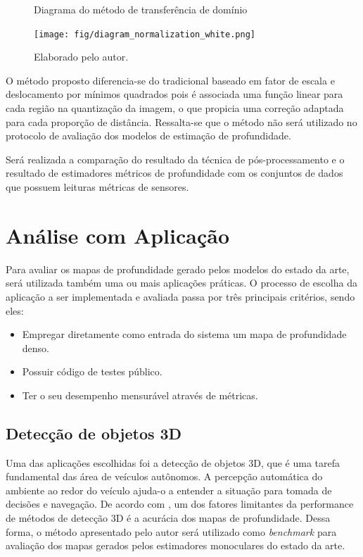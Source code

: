 \begin{figure}[h]
    \centering
    \caption{Diagrama do método de transferência de domínio}
    \texttt{[image: fig/diagram\_normalization\_white.png]}
    \caption*{Elaborado pelo autor.}
    \label{posproc}
\end{figure}

O método proposto diferencia-se do tradicional baseado em fator de escala e deslocamento por mínimos quadrados pois é associada uma função linear para cada região na quantização da imagem, o que propicia uma correção adaptada para cada proporção de distância. Ressalta-se que o método não será utilizado no protocolo de avaliação dos modelos de estimação de profundidade.

Será realizada a comparação do resultado da técnica de pós-processamento e o resultado de estimadores métricos de profundidade com os conjuntos de dados que possuem leituras métricas de sensores.


\section{Análise com Aplicação}

Para avaliar os mapas de profundidade gerado pelos modelos do estado da arte, será utilizada também uma ou mais aplicações práticas. O processo de escolha da aplicação a ser implementada e avaliada passa por três principais critérios, sendo eles: 

\begin{itemize}
    \item Empregar diretamente como entrada do sistema um mapa de profundidade denso.
    \item Possuir código de testes público.
    \item Ter o seu desempenho mensurável através de métricas. 
\end{itemize}

\subsection{Detecção de objetos 3D}

Uma das aplicações escolhidas foi a detecção de objetos 3D, que é uma tarefa fundamental das área de veículos autônomos. A percepção automática do ambiente ao redor do veículo ajuda-o a entender a situação para tomada de decisões e navegação. De acordo com , um dos fatores limitantes da performance de métodos de detecção 3D é a acurácia dos mapas de profundidade. Dessa forma, o método apresentado pelo autor será utilizado como \textit{benchmark} para avaliação dos mapas gerados pelos estimadores monoculares do estado da arte.

